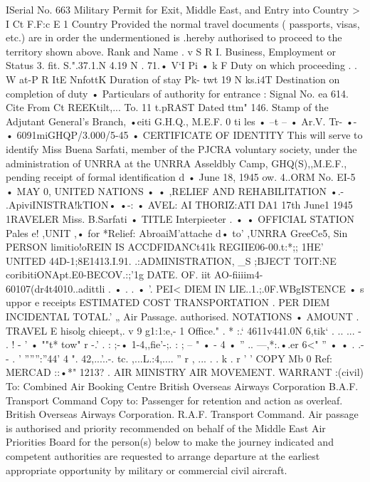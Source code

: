 
ISerial 
No. 
663 
Military Permit for Exit, Middle East, and Entry into 
Country > 
I Ct F.F:c E 1 Country 
Provided the normal travel documents ( passports, visas, etc.) are in order the undermentioned is .hereby 
authorised to proceed to the territory shown above. 
Rank and Name . v S R I. 
Business, Employment or Status 3. fit. S.".37.1.N 4.19 N . 71.• V‘I Pi • k F 
Duty on which proceeding . . W at-P R ItE NnfottK 
Duration of stay Pk- twt 19 N ks.i4T 
Destination on completion of duty 
• 
Particulars of authority for entrance : Signal No. 
ea 614. 
Cite From Ct REEKtilt,... To. 11 t.pRAST Dated ttm" 146. 
Stamp of the Adjutant General's 
Branch, 
•eiti 
G.H.Q., M.E.F. 
0 ti les • 
--t 
-- • Ar.V. 
Tr- 
•-• 
6091miGHQP/3.000/5-45 • 
CERTIFICATE OF IDENTITY 
This will serve to identify Miss Buena Sarfati, member of 
the PJCRA voluntary society, under the administration of 
UNRRA at the UNRRA Asseldbly Camp, GHQ(S),,M.E.F., pending 
receipt of formal identification d 
• 
June 18, 1945 
ow. 
4..ORM No. EI-5 
• MAY 0, 
UNITED NATIONS • • 
,RELIEF AND REHABILITATION •.- 
.ApiviINISTRA!kTION• •-: • 
AVEL: AI THORIZ:ATI 
DA1 17th June1 1945 
1RAVELER 
Miss. 
B.Sarfati 
• TITLE Interpieeter 
. • 
• OFFICIAL STATION Pales e! 
,UNIT ,• for *Relief: AbroaiM'attache d• 
to' ,UNRRA GreeCe5, Sin 
PERSON 
limitio!oREIN IS ACCDFIDANCt41k 
REGIIE06-00.t:*;; 
1HE' UNITED 
44D-1;8E1413.I.91. 
.:ADMINISTRATION, _S ;BJECT TOIT:NE 
coribitiONApt.E0-BECOV.:;'1g DATE. OF. iit AO-fiiiim4- 60107(dr4t4010..adittli 
. 
• 
. . 
• 
'. PEI< DIEM IN LIE..1.;.0F.WBgISTENCE 
• s uppor e receipts 
ESTIMATED COST 
TRANSPORTATION 
. PER DIEM 
INCIDENTAL 
TOTAL.' „ 
Air Passage. authorised. 
NOTATIONS • AMOUNT . 
TRAVEL E 
hisolg 
chieept,. 
v 9 
g1:1:e,- 1 Office." . 
* :.‘ 
4611v441.0N 6,tik‘ 
. .. 
... 
- . ! - ' • ""t* tow" r 
-.' . : ;-• 1-4,,fie'-;. : ; 
-- " • - 4 • '' .. ---,*:.•.er 6<" '' 
• 
• . 
.- 
- 
. ' 
'''''':''44' 4 ". 
42,...'..-. tc. ,...L.:4,.... '' r , ... . . k . r ' ' 
COPY 
Mb 0 
Ref: MERCAD 
::•*" 
1213? . 
AIR MINISTRY AIR MOVEMENT. WARRANT :(civil) 
To: Combined Air Booking Centre 
British Overseas Airways Corporation 
B.A.F. Transport Command 
Copy to: Passenger for retention and action as overleaf. 
British Overseas Airways Corporation. 
R.A.F. Transport Command. 
Air passage is authorised and priority recommended on behalf of the Middle East Air Priorities 
Board for the person(s) below to make the journey indicated and competent authorities are requested to 
arrange departure at the earliest appropriate opportunity by military or commercial civil aircraft. 

